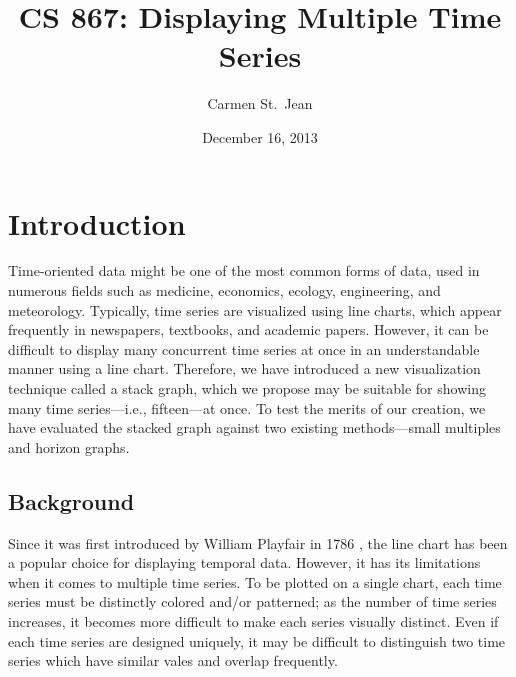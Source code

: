 \documentclass{article}
\begin{document}
\title{CS 867: Displaying Multiple Time Series}
\date{December 16, 2013}
\author{Carmen St.\ Jean}

\maketitle

\section{Introduction}

Time-oriented data might be one of the most common forms of data, used in numerous fields such as medicine, economics, ecology, engineering, and meteorology.  Typically, time series are visualized using line charts, which appear frequently in newspapers, textbooks, and academic papers.  However, it can be difficult to display many concurrent time series at once in an understandable manner using a line chart.  Therefore, we have introduced a new visualization technique called a stack graph, which we propose may be suitable for showing many time series---i.e., fifteen---at once.  To test the merits of our creation, we have evaluated the stacked graph against two existing methods---small multiples and horizon graphs.

\subsection{Background}

Since it was first introduced by William Playfair in 1786 \cite{playfair1786}, the line chart has been a popular choice for displaying temporal data.  However, it has its limitations when it comes to multiple time series.  To be plotted on a single chart, each time series must be distinctly colored and/or patterned; as the number of time series increases, it becomes more difficult to make each series visually distinct.  Even if each time series are designed uniquely, it may be difficult to distinguish two time series which have similar vales and overlap frequently.
\end{document}
